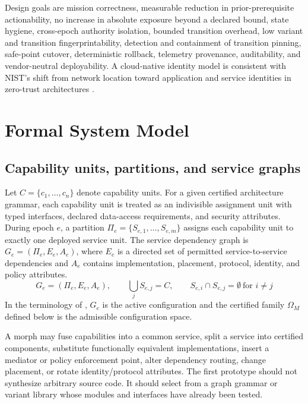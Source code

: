 \documentclass[11pt,letterpaper]{article}
\begin{document}
Design goals are mission correctness, measurable reduction in prior-prerequisite actionability, no increase in absolute exposure beyond a declared bound, state hygiene, cross-epoch authority isolation, bounded transition overhead, low variant and transition fingerprintability, detection and containment of transition pinning, safe-point cutover, deterministic rollback, telemetry provenance, auditability, and vendor-neutral deployability. A cloud-native identity model is consistent with NIST's shift from network location toward application and service identities in zero-trust architectures \cite{nist800207a}.

\section{Formal System Model}\label{sec:model}

\subsection{Capability units, partitions, and service graphs}

Let $C=\{c_1,\dots,c_n\}$ denote capability units. For a given certified architecture grammar, each capability unit is treated as an indivisible assignment unit with typed interfaces, declared data-access requirements, and security attributes. During epoch $e$, a partition $\Pi_e=\{S_{e,1},\dots,S_{e,m}\}$ assigns each capability unit to exactly one deployed service unit. The service dependency graph is $G_e=(\Pi_e,E_e,A_e)$, where $E_e$ is a directed set of permitted service-to-service dependencies and $A_e$ contains implementation, placement, protocol, identity, and policy attributes.
\begin{equation}
G_e=(\Pi_e,E_e,A_e),\qquad \textstyle\bigcup_j S_{e,j}=C,\qquad S_{e,i}\cap S_{e,j}=\emptyset\ \text{for } i\neq j
\end{equation}
In the terminology of \cite{zhuang2014theory}, $G_e$ is the active configuration and the certified family $\Omega_M$ defined below is the admissible configuration space.

A morph may fuse capabilities into a common service, split a service into certified components, substitute functionally equivalent implementations, insert a mediator or policy enforcement point, alter dependency routing, change placement, or rotate identity/protocol attributes. The first prototype should not synthesize arbitrary source code. It should select from a graph grammar or variant library whose modules and interfaces have already been tested.
\end{document}
